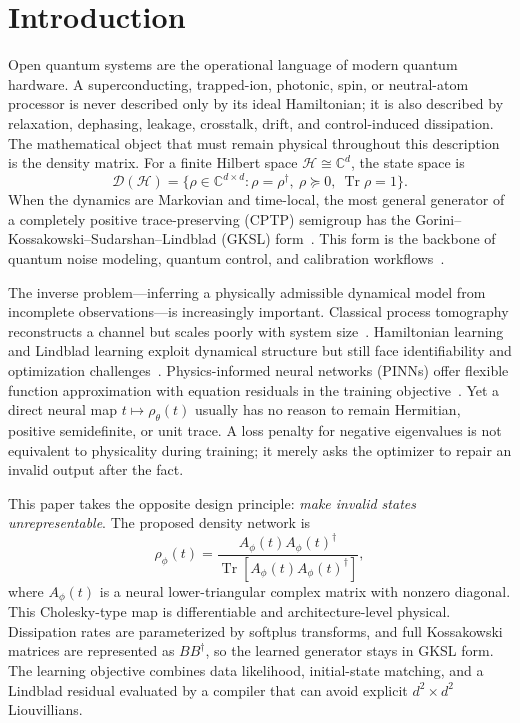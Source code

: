\documentclass[11pt]{article}
\DeclareMathOperator{\Tr}{Tr}
\newcommand{\C}{\mathbb{C}}
\newcommand{\calD}{\mathcal{D}}
\newcommand{\hilb}{\mathcal{H}}
\newcommand{\rhophi}{\rho_{\phi}}
\begin{document}
\section{Introduction}
\label{sec:introduction}

Open quantum systems are the operational language of modern quantum hardware. A superconducting, trapped-ion, photonic, spin, or neutral-atom processor is never described only by its ideal Hamiltonian; it is also described by relaxation, dephasing, leakage, crosstalk, drift, and control-induced dissipation. The mathematical object that must remain physical throughout this description is the density matrix. For a finite Hilbert space $\hilb\cong\C^d$, the state space is
\begin{equation}
    \calD(\hilb)=\{\rho\in\C^{d\times d}:\rho=\rho^\dagger,\ \rho\succeq0,\ \Tr\rho=1\}.
\end{equation}
When the dynamics are Markovian and time-local, the most general generator of a completely positive trace-preserving (CPTP) semigroup has the Gorini--Kossakowski--Sudarshan--Lindblad (GKSL) form~\cite{lindblad1976generators,gorini1976completely,breuer2002theory}. This form is the backbone of quantum noise modeling, quantum control, and calibration workflows~\cite{wiseman2009quantum,krantz2019quantum,leibfried2003quantum,preskill2018quantum}.

The inverse problem---inferring a physically admissible dynamical model from incomplete observations---is increasingly important. Classical process tomography reconstructs a channel but scales poorly with system size~\cite{chuang1997prescription,poyatos1997complete,knee2018quantum}. Hamiltonian learning and Lindblad learning exploit dynamical structure but still face identifiability and optimization challenges~\cite{boulant2003robust,wang2017experimental}. Physics-informed neural networks (PINNs) offer flexible function approximation with equation residuals in the training objective~\cite{raissi2019physics,karniadakis2021physics,chen2018neural}. Yet a direct neural map $t\mapsto \rho_\theta(t)$ usually has no reason to remain Hermitian, positive semidefinite, or unit trace. A loss penalty for negative eigenvalues is not equivalent to physicality during training; it merely asks the optimizer to repair an invalid output after the fact.

This paper takes the opposite design principle: \emph{make invalid states unrepresentable}. The proposed density network is
\begin{equation}
    \rhophi(t)=\frac{A_\phi(t)A_\phi(t)^\dagger}{\Tr[A_\phi(t)A_\phi(t)^\dagger]},
    \label{eq:intro_cholesky}
\end{equation}
where $A_\phi(t)$ is a neural lower-triangular complex matrix with nonzero diagonal. This Cholesky-type map is differentiable and architecture-level physical. Dissipation rates are parameterized by softplus transforms, and full Kossakowski matrices are represented as $BB^\dagger$, so the learned generator stays in GKSL form. The learning objective combines data likelihood, initial-state matching, and a Lindblad residual evaluated by a compiler that can avoid explicit $d^2\times d^2$ Liouvillians.
\end{document}
